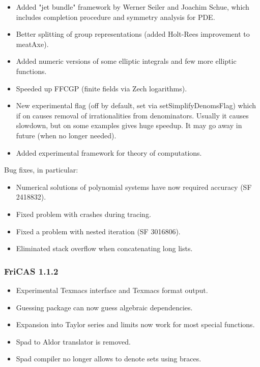 \begin{itemize}
\item Added "jet bundle" framework by Werner Seiler and Joachim Schue,
  which includes completion procedure and symmetry analysis for PDE.

\item Better splitting of group representations (added Holt-Rees
  improvement to meatAxe).

\item Added numeric versions of some elliptic integrals and few more
  elliptic functions.

\item Speeded up FFCGP (finite fields via Zech logarithms).

\item New experimental flag (off by default, set via
  setSimplifyDenomsFlag) which if on causes removal of irrationalities
  from denominators. Usually it causes slowdown, but on some examples
  gives huge speedup. It may go away in future (when no longer
  needed).

\item Added experimental framework for theory of computations.
\end{itemize}

Bug fixes, in particular:

\begin{itemize}
\item Numerical solutions of polynomial systems have now required
  accuracy (SF 2418832).

\item Fixed problem with crashes during tracing.

\item Fixed a problem with nested iteration (SF 3016806).

\item Eliminated stack overflow when concatenating long lists.
\end{itemize}

\subsubsection{FriCAS 1.1.2}

\begin{itemize}
\item Experimental Texmacs interface and Texmacs format output.

\item Guessing package can now guess algebraic dependencies.

\item Expansion into Taylor series and limits now work for most
  special functions.

\item Spad to Aldor translator is removed.

\item Spad compiler no longer allows to denote sets using braces.
\end{itemize}

